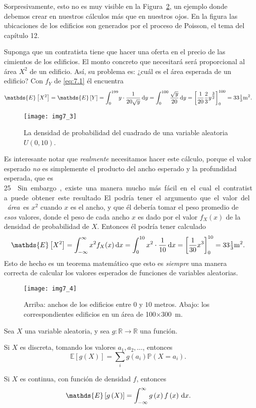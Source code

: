 	Sorpresivamente, esto no es muy visible en la Figura~\ref{fig:7.4}, un ejemplo donde debemos crear en nuestros cálculos más que en nuestros ojos. En la figura las ubicaciones de los edificios son generados por el proceso de Poisson, el tema del capítulo 12.

	Suponga que un contratista tiene que hacer una oferta en el precio de las cimientos de los edificios. El monto concreto que necesitará será proporcional al área $X^2$ de un edificio. Así, su problema es: ¿cuál es el área esperada de un edificio? Con $f_Y$ de \ref{eq:7.1} él encuentra
	\[
		\mathds{E}\left[X^2\right]=\mathds{E}\left[Y\right]
		=\int_{0}^{199}\! y\cdot\frac{1}{20\sqrt{y}}\dl y=\int_{0}^{100}\frac{\sqrt{y}}{20}\dl y
		={\left[\frac{1}{20}\frac{2}{3}y^{\tfrac{3}{2}}\right]}_{0}^{100}=33\tfrac{1}{3}\mathrm{m}^2.
	\]

	\begin{figure}[!ht]
		\centering
		\texttt{[image: img7\_3]}
		\caption{La densidad de probabilidad del cuadrado de una variable aleatoria $U\left(0,10\right)$.}\label{fig:7.3}
	\end{figure}

	Es interesante notar que \emph{realmente} necesitamos hacer este cálculo, porque el valor esperado \emph{no} es simplemente el producto del ancho esperado y la profundidad esperada, que es \SI{25}{\metre\per\square}. Sin embargo, existe una manera mucho más fácil en el cual el contratista puede obtener este resultado. El podría tener el argumento que el valor del \emph{área} es $x^2$ cuando $x$ es el ancho, y que él debería tomar el peso  promedio de \emph{esos} valores, donde el peso de cada ancho $x$ es dado por el valor $f_X(x)$ de la densidad de probabilidad de $X$. Entonces él podría tener calculado
	\[
		\mathds{E}\left[X^2\right]=\int_{-\infty}^{\infty}x^2f_X(x)\dl x=\int_{0}^{10}x^2\cdot\frac{1}{10}\dl x={\left[\frac{1}{30}x^3\right]}_{0}^{10}=33\tfrac{1}{3}\mathrm{m}^{2}.
	\]
	Esto de hecho es un teorema matemático que esto es \emph{siempre} una manera correcta de calcular los valores esperados de funciones de variables aleatorias.

	\begin{figure}[!ht]
		\centering
		\texttt{[image: img7\_4]}
		\caption{Arriba: anchos de los edificios entre $0$ y $10$ metros. Abajo: los correspondientes edificios en un área de \num{100}$\times$\SI{300}{\metre}.}\label{fig:7.4}
	\end{figure}

	\begin{theorem}
		Sea $X$ una variable aleatoria, y sea $g\colon\mathds{R}\rightarrow\mathds{R}$ una función.

		Si $X$ es discreta, tomando los valores $a_1, a_2, \ldots$, entonces
		\[
			\mathds{E}\left[g\left(X\right)\right]=\sum_{i}g\left(a_{i}\right)\mathds{P}\left(X=a_{i}\right).
		\]

		Si $X$ es continua, con función de densidad $f$, entonces
		\[
			\mathds{E}\left[g\left(X\right)\right]=\int_{-\infty}^{\infty}g\left(x\right)f\left(x\right)\dl x.
		\]
	\end{theorem}